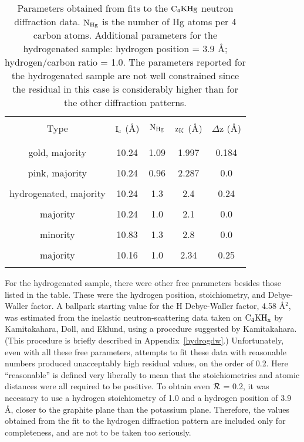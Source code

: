 \begin{table}
\caption[Parameters obtained from fits to the $\rm C_4KHg$ neutron
diffraction data.]{Parameters  obtained  from  fits   to  the $\rm  C_4KHg$
neutron diffraction  data.   $\rm N_{Hg}$  is the number  of Hg atoms per 4
carbon atoms.  Additional parameters for the  hydrogenated sample: hydrogen
position = 3.9 \AA;  hydrogen/carbon ratio  = 1.0.  The parameters reported
for the hydrogenated sample are not well constrained  since the residual in
this case is considerably higher than for the other diffraction patterns.}
\label{neutnum}
\begin{center}
\begin{tabular}{|ccccc|}
\hline
& & & & \\
Type & $\rm I_c$ (\AA) & $\rm N_{Hg}$  & $\rm z_K$ (\AA) & $\Delta$z (\AA) \\
& & & & \\
\hline
& & & & \\
gold, majority  & 10.24 & 1.09 & 1.997 & 0.184 \\
& & & & \\
pink, majority  & 10.24 & 0.96 & 2.287 & 0.0 \\
& & & & \\
hydrogenated, majority  & 10.24 & 1.3 & 2.4 & 0.24 \\ 
& & & & \\
majority\cite{yang84} & 10.24 & 1.0 & 2.1 & 0.0 \\
& & & & \\
minority\cite{yang84} & 10.83 & 1.3 & 2.8 & 0.0 \\
& & & & \\
majority\cite{elmakrini80} & 10.16 & 1.0 & 2.34 & 0.25 \\
& & & & \\
\hline
\end{tabular}
\end{center}
\end{table}

        For  the  hydrogenated sample, there   were other  free  parameters
besides those  listed in the table.   These  were the   hydrogen  position,
stoichiometry, and Debye-Waller factor.  A ballpark starting  value for the
H Debye-Waller factor,  4.58  \AA$^2$,  was  estimated  from  the inelastic
neutron-scattering data taken on $\rm  C_4KH_x$  by Kamitakahara, Doll, and
Eklund,\cite{solin88}        using    a     procedure     suggested      by
Kamitakahara.\cite{kamitakahara88} (This procedure is briefly  described in
Appendix~\ref{hydrogdw}.)  Unfortunately,   even   with all these  free  parameters,
attempts to  fit these data with  reasonable  numbers produced  unacceptably
high residual values, on the order of 0.2.  Here  ``reasonable'' is defined
very liberally to  mean that the  stoichiometries and atomic distances were
all  required  to  be positive.  To obtain even   $\cal  R$ =  0.2,  it was
necessary to use a hydrogen stoichiometry of 1.0 and a hydrogen position of
3.9 \AA, closer to the graphite plane than the potassium plane.  Therefore,
the values obtained from  the fit to the  hydrogen diffraction  pattern are
included only for completeness, and are not to be taken too seriously.

